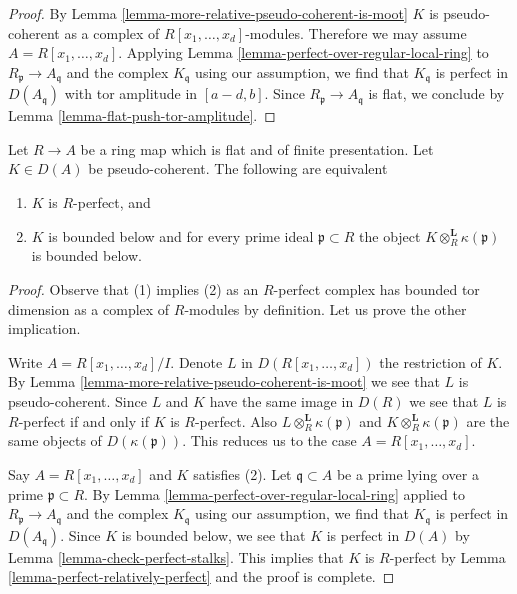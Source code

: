 \begin{proof}
By Lemma \ref{lemma-more-relative-pseudo-coherent-is-moot}
$K$ is pseudo-coherent as a complex of $R[x_1, \ldots, x_d]$-modules.
Therefore we may assume $A = R[x_1, \ldots, x_d]$.
Applying Lemma \ref{lemma-perfect-over-regular-local-ring}
to $R_\mathfrak p \to A_\mathfrak q$ and the complex $K_\mathfrak q$
using our assumption, we find that $K_\mathfrak q$ is perfect
in $D(A_\mathfrak q)$ with tor amplitude in $[a - d, b]$.
Since $R_\mathfrak p \to A_\mathfrak q$ is flat, we conclude
by Lemma \ref{lemma-flat-push-tor-amplitude}.
\end{proof}

\begin{lemma}
\label{lemma-bounded-on-fibres-relatively-perfect}
Let $R \to A$ be a ring map which is flat and of finite presentation.
Let $K \in D(A)$ be pseudo-coherent. The following are equivalent
\begin{enumerate}
\item $K$ is $R$-perfect, and
\item $K$ is bounded below and for every prime ideal $\mathfrak p \subset R$
the object $K \otimes_R^\mathbf{L} \kappa(\mathfrak p)$ is bounded below.
\end{enumerate}
\end{lemma}

\begin{proof}
Observe that (1) implies (2) as an $R$-perfect complex has bounded
tor dimension as a complex of $R$-modules by definition. Let us prove
the other implication.

\medskip\noindent
Write $A = R[x_1, \ldots, x_d]/I$. Denote $L$ in $D(R[x_1, \ldots, x_d])$
the restriction of $K$. By
Lemma \ref{lemma-more-relative-pseudo-coherent-is-moot}
we see that $L$ is pseudo-coherent.
Since $L$ and $K$ have the same image in $D(R)$ we see that
$L$ is $R$-perfect if and only if $K$ is $R$-perfect.
Also $L \otimes_R^\mathbf{L} \kappa(\mathfrak p)$
and $K \otimes_R^\mathbf{L} \kappa(\mathfrak p)$ are the same objects of
$D(\kappa(\mathfrak p))$. This reduces us to the case
$A = R[x_1, \ldots, x_d]$.

\medskip\noindent
Say $A = R[x_1, \ldots, x_d]$ and $K$ satisfies (2).
Let $\mathfrak q \subset A$ be a prime lying over a
prime $\mathfrak p \subset R$. By
Lemma \ref{lemma-perfect-over-regular-local-ring} applied
to $R_\mathfrak p \to A_\mathfrak q$ and the complex $K_\mathfrak q$
using our assumption, we find that $K_\mathfrak q$ is perfect
in $D(A_\mathfrak q)$. Since $K$ is bounded below, we see that
$K$ is perfect in $D(A)$ by 
Lemma \ref{lemma-check-perfect-stalks}.
This implies that $K$ is $R$-perfect by
Lemma \ref{lemma-perfect-relatively-perfect}
and the proof is complete.
\end{proof}











